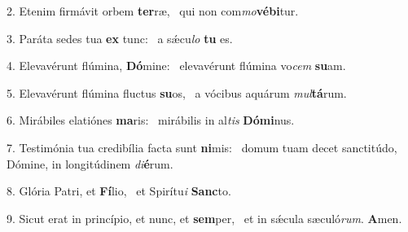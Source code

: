 2. Etenim firmávit orbem \textbf{ter}ræ, \ast\  qui non com\textit{mo}\textbf{vé}\textbf{bi}tur.\

3. Paráta sedes tua \textbf{ex} tunc: \ast\  a sǽcu\textit{lo} \textbf{tu} es.\

4. Elevavérunt flúmina, \textbf{Dó}mine: \ast\  elevavérunt flúmina vo\textit{cem} \textbf{su}am.\

5. Elevavérunt flúmina fluctus \textbf{su}os, \ast\  a vócibus aquárum \textit{mul}\textbf{tá}rum.\

6. Mirábiles elatiónes \textbf{ma}ris: \ast\  mirábilis in al\textit{tis} \textbf{Dó}\textbf{mi}nus.\

7. Testimónia tua credibília facta sunt \textbf{ni}mis: \ast\  domum tuam decet sanctitúdo, Dómine, in longitúdinem \textit{di}\textbf{é}rum.\

8. Glória Patri, et \textbf{Fí}lio, \ast\  et Spirítu\textit{i} \textbf{Sanc}to.\

9. Sicut erat in princípio, et nunc, et \textbf{sem}per, \ast\  et in sǽcula sæculó\textit{rum}. \textbf{A}men.\

